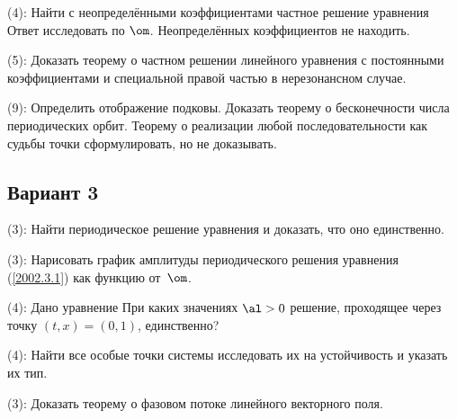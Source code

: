\documentclass[a4paper]{article}
\newcommand{\skill}[1]{\textsf{(#1):}}
\begin{document}
\begin{problem}
\skill{4}
Найти с неопределёнными коэффициентами частное решение уравнения
Ответ исследовать по $\om$. Неопределённых коэффициентов не находить.
\end{problem}

\begin{problem}
\skill{5} Доказать теорему о частном решении линейного уравнения с постоянными коэффициентами
и специальной правой частью в нерезонансном случае.
\end{problem}

\begin{problem}
\skill{9} Определить отображение подковы. Доказать теорему о бесконечности числа периодических орбит.
Теорему о реализации любой последовательности как судьбы точки сформулировать, но не доказывать.
\end{problem}

\subsection{Вариант 3}

\begin{problem}
\skill{3}
Найти периодическое решение уравнения
и доказать, что оно единственно.
\end{problem}

\begin{problem}
\skill{3} Нарисовать график амплитуды периодического решения уравнения (\ref{2002.3.1}) как функцию от~$\om$.
\end{problem}

\begin{problem}
\skill{4}
Дано уравнение
При каких значениях $\al > 0$ решение, проходящее через точку $(t,x) = (0,1)$, единственно?
\end{problem}

\begin{problem}
\skill{4}
Найти все особые точки системы
исследовать их на устойчивость и указать их тип.
\end{problem}

\begin{problem}
\skill{3} Доказать теорему о фазовом потоке линейного векторного поля.
\end{problem}
\end{document}

